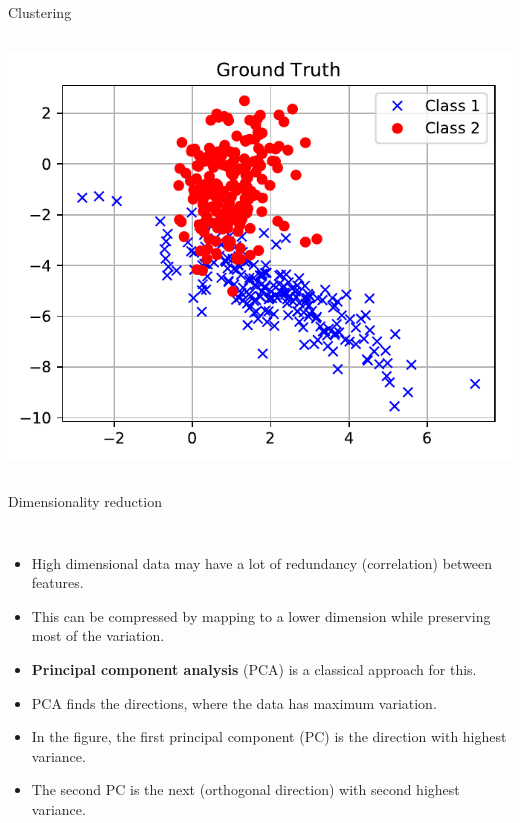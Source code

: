 \documentclass[10pt, aspectratio=169]{beamer} %
\begin{document}
\begin{frame}[fragile, allowframebreaks=0.8]{Clustering}
\begin{columns}
\begin{center}
			\includegraphics[width=0.4\columnwidth]{kmeans_true.pdf}
		\end{center}
		\end{columns}
\end{frame}

\begin{frame}[fragile, allowframebreaks=0.8]{Dimensionality reduction}
		\begin{columns}
	    \begin{itemize}
			\item High dimensional data may have a lot of redundancy (correlation) between features.
			\item This can be compressed by mapping to a lower dimension while preserving most of the variation.
			\item \textbf{Principal component analysis} (PCA) is a classical approach for this.
			\item PCA finds the directions, where the data has maximum variation.
			\item In the figure, the first principal component (PC) is the direction with highest variance.
			\item The second PC is the next (orthogonal direction) with second highest variance.
	    \end{itemize}
			

\end{columns}
\end{frame}
\end{document}
